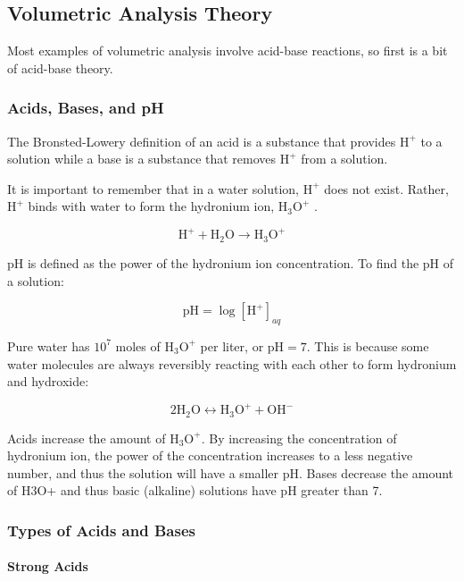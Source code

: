 \subsection{Volumetric Analysis Theory}

Most examples of volumetric analysis involve acid-base reactions, so first is a bit of acid-base theory.

\subsubsection{Acids, Bases, and pH}

The Bronsted-Lowery definition of an acid is a substance that provides $\mathrm{H}^{+}$ to a solution while a base is a substance that removes $\mathrm{H}^{+}$ from a solution.

It is important to remember that in a water solution, $\mathrm{H}^{+}$ does not exist. Rather, $\mathrm{H}^{+}$ binds with water to form the hydronium ion, $ \mathrm{H}_3 \mathrm{O}^{+} $ .

\[ \mathrm{H}^{+} + \mathrm{H}_2 \mathrm{O} \longrightarrow \mathrm{H}_3 \mathrm{O}^{+} \]

pH is defined as the power of the hydronium ion concentration. To find the pH of a solution:

\[ \mathrm{pH} = \log{[\mathrm{H}^{+}]_{aq}} \]

Pure water has $ 10^{7} $ moles of $\mathrm{H}_3 \mathrm{O}^{+}$ per liter, or $ \mathrm{pH} = 7 $. This is because some water molecules are always reversibly reacting with each other to form hydronium and hydroxide:

\[ 2\mathrm{H}_2\mathrm{O} \longleftrightarrow \mathrm{H}_3 \mathrm{O}^{+} + \mathrm{OH}^{-} \]

Acids increase the amount of $\mathrm{H}_3 \mathrm{O}^{+}$. By increasing the concentration of hydronium ion, the power of the concentration increases to a less negative number, and thus the solution will have a smaller pH. Bases decrease the amount of H3O+ and thus basic (alkaline) solutions have pH greater than 7.

\subsubsection{Types of Acids and Bases}

\paragraph{Strong Acids}

